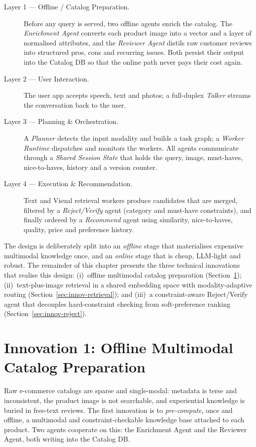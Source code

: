 \begin{description}
  \item[Layer 1 --- Offline / Catalog Preparation.] Before any query is served,
  two offline agents enrich the catalog. The \emph{Enrichment Agent} converts
  each product image into a vector and a layer of normalised attributes, and the
  \emph{Reviewer Agent} distils raw customer reviews into structured pros, cons
  and recurring issues. Both persist their output into the Catalog DB so that the
  online path never pays their cost again.
  \item[Layer 2 --- User Interaction.] The user app accepts speech, text and
  photos; a full-duplex \emph{Talker} streams the conversation back to the user.
  \item[Layer 3 --- Planning \& Orchestration.] A \emph{Planner} detects the
  input modality and builds a task graph; a \emph{Worker Runtime} dispatches and
  monitors the workers. All agents communicate through a \emph{Shared Session
  State} that holds the query, image, must-haves, nice-to-haves, history and a
  version counter.
  \item[Layer 4 --- Execution \& Recommendation.] Text and Visual retrieval
  workers produce candidates that are merged, filtered by a \emph{Reject/Verify}
  agent (category and must-have constraints), and finally ordered by a
  \emph{Recommend} agent using similarity, nice-to-haves, quality, price and
  preference history.
\end{description}

The design is deliberately split into an \emph{offline} stage that materialises
expensive multimodal knowledge once, and an \emph{online} stage that is cheap,
LLM-light and robust. The remainder of this chapter presents the three technical
innovations that realise this design: (i)~offline multimodal catalog
preparation (Section~\ref{sec:innov-offline}); (ii)~text-plus-image retrieval in
a shared embedding space with modality-adaptive routing
(Section~\ref{sec:innov-retrieval}); and (iii)~a constraint-aware Reject/Verify
agent that decouples hard-constraint checking from soft-preference ranking
(Section~\ref{sec:innov-reject}).

\section{Innovation 1: Offline Multimodal Catalog Preparation}
\label{sec:innov-offline}

Raw e-commerce catalogs are sparse and single-modal: metadata is terse and
inconsistent, the product image is not searchable, and experiential knowledge is
buried in free-text reviews. The first innovation is to \emph{pre-compute}, once
and offline, a multimodal and constraint-checkable knowledge base attached to
each product. Two agents cooperate on this: the Enrichment Agent and the Reviewer
Agent, both writing into the Catalog DB.

